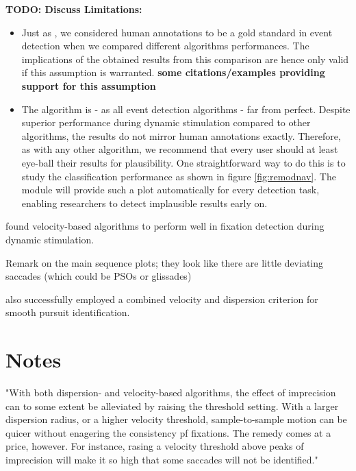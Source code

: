 \textbf{TODO: Discuss Limitations:}
\begin{itemize}
	\item Just as \cite{Andersson2017}, we considered human annotations to be a gold standard in event detection when we compared different algorithms performances. The implications of the obtained results from this comparison are hence only valid if this assumption is warranted. \textbf{some citations/examples providing support for this assumption}
	\item The \remodnav algorithm is - as all event detection algorithms - far from perfect. Despite superior performance during dynamic stimulation compared to other algorithms, the results do not mirror human annotations exactly. Therefore, as with any other algorithm, we recommend that every user should at least eye-ball their results for plausibility. One straightforward way to do this is to study the classification performance as shown in figure \ref{fig:remodnav}. The \remodnav module will provide such a plot automatically for every detection task, enabling researchers to detect implausible results early on.
\end{itemize}


\cite{munn2008fixation} found velocity-based algorithms to perform well in fixation detection during dynamic stimulation.

Remark on the main sequence plots; they look like there are little deviating saccades (which could be PSOs or glissades)

\cite{Komogortsev2013} also successfully employed a combined velocity and dispersion criterion for smooth pursuit identification.

\section*{Notes} %



"With both dispersion- and velocity-based algorithms, the effect of imprecision can to some extent be alleviated by raising the threshold setting. With a larger dispersion radius, or a higher velocity threshold, sample-to-sample motion can be quicer without enagering the consistency pf fixations. The remedy comes at a price, however. For instance, rasing a velocity threshold above peaks of imprecision will make it so high that some saccades will not be identified."

